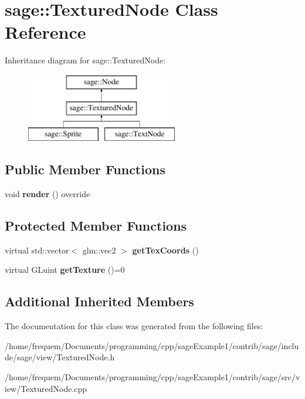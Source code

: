 \hypertarget{classsage_1_1TexturedNode}{}\section{sage\+::Textured\+Node Class Reference}
\label{classsage_1_1TexturedNode}
Inheritance diagram for sage\+::Textured\+Node\+:\begin{figure}[H]
\begin{center}
\leavevmode
\includegraphics[height=3.000000cm]{classsage_1_1TexturedNode}
\end{center}
\end{figure}
\subsection*{Public Member Functions}
\begin{DoxyCompactItemize}
\item 
\mbox{\label{classsage_1_1TexturedNode_a17465d5cb984880866f90145bb93d928}} 
void {\bfseries render} () override
\end{DoxyCompactItemize}
\subsection*{Protected Member Functions}
\begin{DoxyCompactItemize}
\item 
\mbox{\label{classsage_1_1TexturedNode_ada858d240f8074fd97e8a72e74d18a30}} 
virtual std\+::vector$<$ glm\+::vec2 $>$ {\bfseries get\+Tex\+Coords} ()
\item 
\mbox{\label{classsage_1_1TexturedNode_a079cea0b12a1d0e3ea69459546736c0f}} 
virtual G\+Luint {\bfseries get\+Texture} ()=0
\end{DoxyCompactItemize}
\subsection*{Additional Inherited Members}


The documentation for this class was generated from the following files\+:\begin{DoxyCompactItemize}
\item 
/home/frequem/\+Documents/programming/cpp/sage\+Example1/contrib/sage/include/sage/view/Textured\+Node.\+h\item 
/home/frequem/\+Documents/programming/cpp/sage\+Example1/contrib/sage/src/view/Textured\+Node.\+cpp\end{DoxyCompactItemize}
